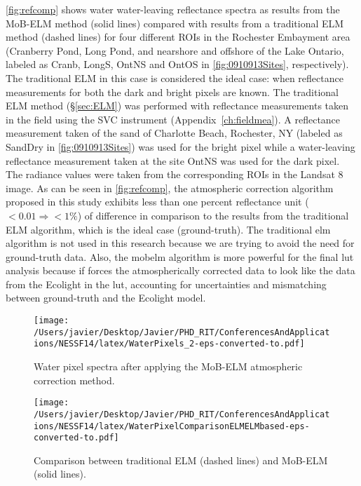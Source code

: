 \autoref{fig:refcomp} shows water water-leaving reflectance spectra as results from the MoB-ELM method (solid lines) compared with results from a traditional ELM method (dashed lines) for four different ROIs in the Rochester Embayment area (Cranberry Pond, Long Pond, and nearshore and offshore of the Lake Ontario, labeled as Cranb, LongS, OntNS and OntOS in \autoref{fig:0910913Sites}, respectively). The traditional ELM in this case is considered the ideal case: when reflectance measurements for both the dark and bright pixels are known. The traditional ELM method (\S\ref{sec:ELM}) was performed with reflectance measurements taken in the field using the SVC instrument \citep{SVCHR1024i} (Appendix~\ref{ch:fieldmea}). A reflectance measurement taken of the sand of Charlotte Beach, Rochester, NY (labeled as SandDry in \autoref{fig:0910913Sites}) was used for the bright pixel while a water-leaving reflectance measurement taken at the site OntNS was used for the dark pixel. The radiance values were taken from the corresponding ROIs in the Landsat 8 image. As can be seen in \autoref{fig:refcomp}, the atmospheric correction algorithm proposed in this study exhibits less than one percent reflectance unit ($<0.01\Rightarrow <1\%$) of difference in comparison to the results from the traditional ELM algorithm, which is the ideal case (ground-truth). The traditional \gls{elm} algorithm is not used in this research because we are trying to avoid the need for ground-truth data. Also, the \gls{mobelm} algorithm is more powerful for the final \gls{lut} analysis because if forces the atmospherically corrected data to look like the data from the Ecolight in the \gls{lut}, accounting for uncertainties and mismatching between ground-truth and the Ecolight model.

\begin{figure}[htb]
    \centering
      \texttt{[image: /Users/javier/Desktop/Javier/PHD\_RIT/ConferencesAndApplications/NESSF14/latex/WaterPixels\_2-eps-converted-to.pdf]}
      \caption{Water pixel spectra after applying the MoB-ELM atmospheric correction method.}
      \label{fig:waterpxs}
\end{figure}


\begin{figure}[htb]
    \centering
      \texttt{[image: /Users/javier/Desktop/Javier/PHD\_RIT/ConferencesAndApplications/NESSF14/latex/WaterPixelComparisonELMELMbased-eps-converted-to.pdf]}
      \caption{Comparison between traditional ELM (dashed lines) and MoB-ELM (solid lines).}
      \label{fig:refcomp}
\end{figure}
